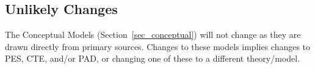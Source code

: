 \subsection{Unlikely Changes}\label{sec_Unlikely}

The Conceptual Models (Section~\ref{sec_conceptual}) will not change as they 
are drawn directly from primary sources. Changes to these models implies 
changes to PES, CTE, and/or PAD, or changing one of these to a different 
theory/model.